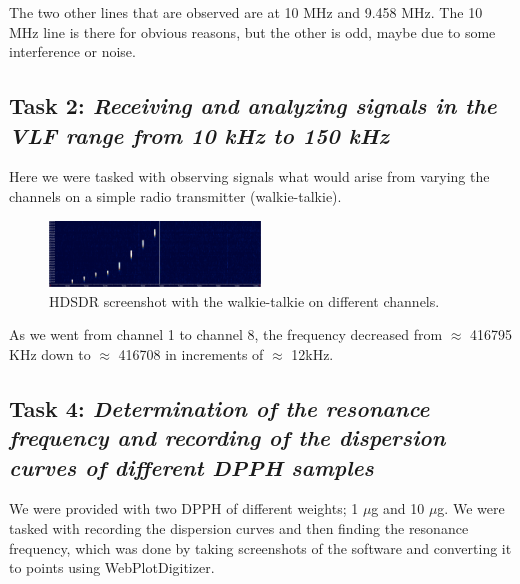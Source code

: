 \documentclass{article}
\begin{document}
The two other lines that are observed are at 10 MHz and 9.458 MHz. The 10 MHz line is there for obvious reasons, but the other is odd, maybe due to some interference or noise.


\subsection{Task 2: \textit{Receiving and analyzing signals in the VLF range from 10 kHz to 150 kHz }}

Here we were tasked with observing signals what would arise from varying the channels on a simple radio transmitter (walkie-talkie). 

\begin{figure}[h]
	\centering
	\includegraphics[width=0.5\textwidth]{Figures/Task 2/Radio.png}
	\caption{HDSDR screenshot with the walkie-talkie on different channels.}
	\label{fig:radio}
\end{figure}

As we went from channel 1 to channel 8, the frequency decreased from $\approx$ 416795 KHz down to $\approx$ 416708 in increments of $\approx$ 12kHz.

\pagebreak{}

\subsection{Task 4: \textit{Determination of the resonance frequency and recording of the dispersion curves of different DPPH samples}}

We were provided with two DPPH of different weights; 1 $\mu$g and 10 $\mu$g. We were tasked with recording the dispersion curves and then finding the resonance frequency, which was done by taking screenshots of the software and converting it to points using WebPlotDigitizer. \cite{automerisio} 
\end{document}
